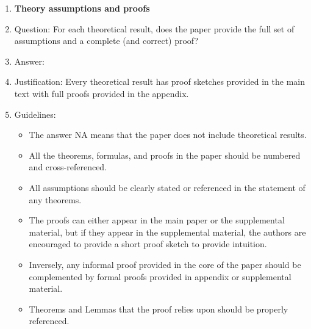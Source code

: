 \documentclass{article}
\theoremstyle{plain}
\theoremstyle{definition}
\theoremstyle{remark}
\begin{document}
\begin{enumerate}
\item {\bf Theory assumptions and proofs}
    \item[] Question: For each theoretical result, does the paper provide the full set of assumptions and a complete (and correct) proof?
    \item[] Answer: \answerYes{} %
    \item[] Justification: Every theoretical result has proof sketches provided in the main text with full proofs provided in the appendix. 
    \item[] Guidelines:
    \begin{itemize}
        \item The answer NA means that the paper does not include theoretical results. 
        \item All the theorems, formulas, and proofs in the paper should be numbered and cross-referenced.
        \item All assumptions should be clearly stated or referenced in the statement of any theorems.
        \item The proofs can either appear in the main paper or the supplemental material, but if they appear in the supplemental material, the authors are encouraged to provide a short proof sketch to provide intuition. 
        \item Inversely, any informal proof provided in the core of the paper should be complemented by formal proofs provided in appendix or supplemental material.
        \item Theorems and Lemmas that the proof relies upon should be properly referenced. 
    \end{itemize}


\end{enumerate}
\end{document}
